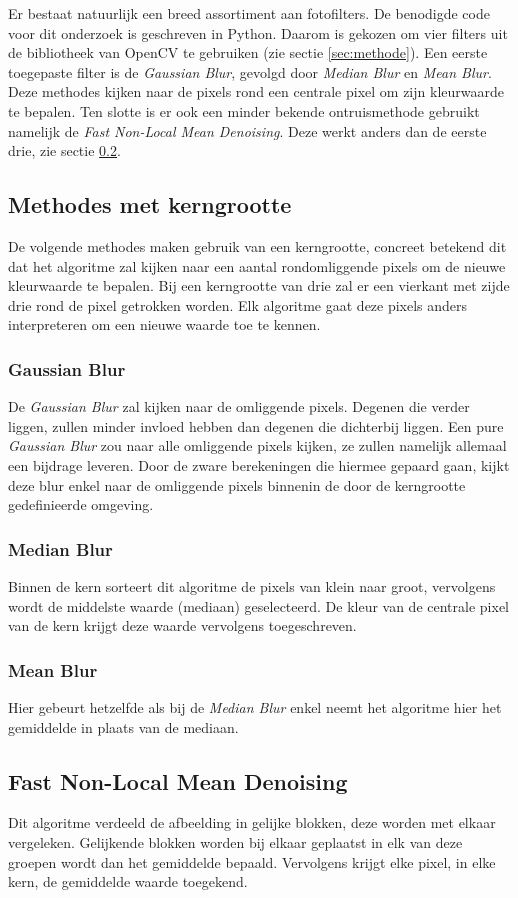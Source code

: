 Er bestaat natuurlijk een breed assortiment aan fotofilters. De benodigde code voor dit onderzoek is geschreven in Python. Daarom is gekozen om vier filters uit de bibliotheek van OpenCV te gebruiken (zie sectie \ref{sec:methode}).  Een eerste toegepaste filter is de \textit{Gaussian Blur}, gevolgd door \textit{Median Blur} en \textit{Mean Blur}. Deze methodes kijken naar de pixels rond een centrale pixel om zijn kleurwaarde te bepalen. Ten slotte is er ook een minder bekende ontruismethode gebruikt namelijk de \textit{Fast Non-Local Mean Denoising}. Deze werkt anders dan de eerste drie, zie sectie \ref{subsec:fnlmd}.

\subsection{Methodes met kerngrootte}
De volgende methodes maken gebruik van een kerngrootte, concreet betekend dit dat het algoritme zal kijken naar een aantal rondomliggende pixels om de nieuwe kleurwaarde te bepalen. Bij een kerngrootte van drie zal er een vierkant met zijde drie rond de pixel getrokken worden. Elk algoritme gaat deze pixels anders interpreteren om een nieuwe waarde toe te kennen.
\subsubsection{Gaussian Blur}
De {\it Gaussian Blur} zal kijken naar de omliggende pixels. Degenen die verder liggen, zullen minder invloed hebben dan degenen die dichterbij liggen. Een pure {\it Gaussian Blur} zou naar alle omliggende pixels kijken, ze zullen namelijk allemaal een bijdrage leveren. Door de zware berekeningen die hiermee gepaard gaan, kijkt deze blur enkel naar de omliggende pixels binnenin de door de kerngrootte gedefinieerde omgeving. \cite{gaussianBlur}

\subsubsection{Median Blur}
Binnen de kern sorteert dit algoritme de pixels van klein naar groot, vervolgens wordt de middelste waarde (mediaan) geselecteerd. De kleur van de centrale pixel van de kern krijgt deze waarde vervolgens toegeschreven.

\subsubsection{Mean Blur}
Hier gebeurt hetzelfde als bij de {\it Median Blur} enkel neemt het algoritme hier het gemiddelde in plaats van de mediaan.

\subsection{Fast Non-Local Mean Denoising}
\label{subsec:fnlmd}
Dit algoritme verdeeld de afbeelding in gelijke blokken, deze worden met elkaar vergeleken. Gelijkende blokken worden bij elkaar geplaatst in elk van deze groepen wordt dan het gemiddelde bepaald. Vervolgens krijgt elke pixel, in elke kern, de gemiddelde waarde toegekend. \cite{fastExplanation}